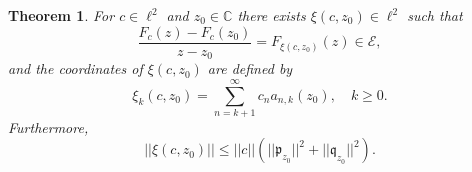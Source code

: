 \documentclass [12pt]{article}
\newtheorem{thm}{Theorem}[section]
\newcommand{\C}{\mathbb{C}}
\begin{document}
\begin{thm}\label{thm:deB} For $c\in\ell^2$  and $z_0\in\C$ there exists $\xi(c,z_0)\in\ell^2$ such that
\begin{equation}\label{eq:Fcq}
\frac{F_c(z)-F_c(z_0)}{z-z_0}=F_{\xi(c,z_0)}(z) \in\mathcal E, 
\end{equation}
and the coordinates of $\xi(c,z_0)$ are defined by 
\begin{equation}\label{eq:xi}
\xi_k(c,z_0)=\sum_{n=k+1}^\infty c_n a_{n,k}(z_0),\quad k\ge 0.
\end{equation}
Furthermore,
\begin{equation}\label{eq:normxi}
||\xi(c,z_0)|| \le ||c||\left(||\mathfrak{p}_{z_0}||^2+||\mathfrak{q}_{z_0}||^2\right).
\end{equation}
\end{thm}
\end{document}
